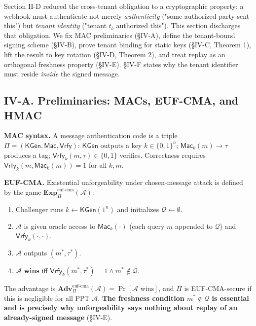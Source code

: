 Section II-D reduced the cross-tenant obligation to a cryptographic
property: a webhook must authenticate not merely \emph{authenticity}
("some authorized party sent this") but \emph{tenant identity} ("tenant
\(t_b\) authorized this"). This section discharges that obligation. We
fix MAC preliminaries (§IV-A), define the tenant-bound signing scheme
(§IV-B), prove tenant binding for static keys (§IV-C, Theorem 1), lift
the result to key rotation (§IV-D, Theorem 2), and treat replay as an
orthogonal freshness property (§IV-E). §IV-F states why the tenant
identifier must reside \emph{inside} the signed message.

\subsection{IV-A. Preliminaries: MACs, EUF-CMA, and
HMAC}\label{iv-a-preliminaries-macs-euf-cma-and-hmac}

\textbf{MAC syntax.} A message authentication code is a triple
\(\Pi=(\mathsf{KGen},\mathsf{Mac},
\mathsf{Vrfy})\): \(\mathsf{KGen}\) outputs a key \(k\in\{0,1\}^n\);
\(\mathsf{Mac}_k(m)\to\tau\) produces a tag;
\(\mathsf{Vrfy}_k(m,\tau)\in\{0,1\}\) verifies. Correctness requires
\(\mathsf{Vrfy}_k(m,\mathsf{Mac}_k(m))=1\) for all \(k,m\).

\textbf{EUF-CMA.} Existential unforgeability under chosen-message attack
is defined by the game
\(\mathbf{Exp}^{\text{euf-cma}}_{\Pi}(\mathcal{A})\):

\begin{enumerate}
\def\labelenumi{\arabic{enumi}.}
\tightlist
\item
  Challenger runs \(k\leftarrow\mathsf{KGen}(1^n)\) and initializes
  \(\mathcal{Q}\leftarrow\emptyset\).
\item
  \(\mathcal{A}\) is given oracle access to \(\mathsf{Mac}_k(\cdot)\)
  (each query \(m\) appended to \(\mathcal{Q}\)) and
  \(\mathsf{Vrfy}_k(\cdot,\cdot)\).
\item
  \(\mathcal{A}\) outputs \((m^*,\tau^*)\).
\item
  \(\mathcal{A}\) \textbf{wins} iff
  \(\mathsf{Vrfy}_k(m^*,\tau^*)=1 \wedge m^*\notin\mathcal{Q}\).
\end{enumerate}

The advantage is
\(\mathbf{Adv}^{\text{euf-cma}}_{\Pi}(\mathcal{A})=\Pr[\mathcal{A}\text{ wins}]\),
and \(\Pi\) is EUF-CMA-secure if this is negligible for all PPT
\(\mathcal{A}\). \textbf{The freshness condition
\(m^*\notin\mathcal{Q}\) is essential and is precisely why
unforgeability says nothing about replay of an already-signed message}
(§IV-E).

